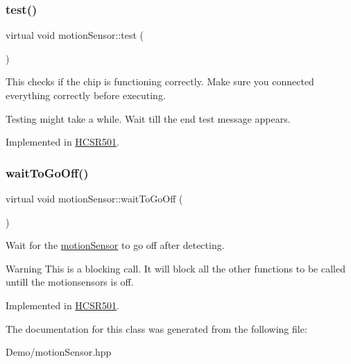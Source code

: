 \subsubsection{\texorpdfstring{test()}{test()}}
{\footnotesize\ttfamily virtual void motion\+Sensor\+::test (\begin{DoxyParamCaption}{ }\end{DoxyParamCaption})\hspace{0.3cm}{\ttfamily [pure virtual]}}



This checks if the chip is functioning correctly. Make sure you connected everything correctly before executing. 

Testing might take a while. Wait till the end test message appears. 

Implemented in \mbox{\hyperlink{class_h_c_s_r501_ad90e8669ce7d60213c917c9213366798}{H\+C\+S\+R501}}.

\mbox{\label{classmotion_sensor_a855b7f86c8ef833bbcd2064a220a4b58}} 
\subsubsection{\texorpdfstring{wait\+To\+Go\+Off()}{waitToGoOff()}}
{\footnotesize\ttfamily virtual void motion\+Sensor\+::wait\+To\+Go\+Off (\begin{DoxyParamCaption}{ }\end{DoxyParamCaption})\hspace{0.3cm}{\ttfamily [pure virtual]}}



Wait for the \mbox{\hyperlink{classmotion_sensor}{motion\+Sensor}} to go off after detecting. 

\begin{DoxyWarning}{Warning}
This is a blocking call. It will block all the other functions to be called untill the motionsensors is off. 
\end{DoxyWarning}


Implemented in \mbox{\hyperlink{class_h_c_s_r501_ad300c0219deddb52c3a5e443be9a96cd}{H\+C\+S\+R501}}.



The documentation for this class was generated from the following file\+:\begin{DoxyCompactItemize}
\item 
Demo/motion\+Sensor.\+hpp\end{DoxyCompactItemize}
